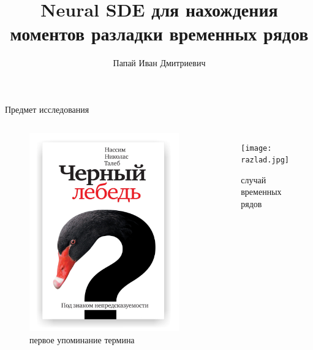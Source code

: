 \documentclass{beamer}
\title[\hbox to 56mm{Neural SDE}]{Neural SDE для нахождения моментов разладки временных рядов}
\author[И.\,Д. Папай]{Папай Иван Дмитриевич}
\institute{Московский физико-технический институт}
\date{\footnotesize
\par\smallskip\emph{Курс:} Автоматизация научных исследований\par (практика, В.\,В.~Стрижов)/Группа 128б
\par\smallskip\emph{Эксперт:} В.\,В.~Стрижов
\par\smallskip\emph{Консультант:} Э.\,А.~Владимиров
\par\bigskip\small 2024}
\begin{document}
\begin{frame}
\thispagestyle{empty}
\maketitle
\end{frame}
\begin{frame}{Предмет исследования}

\begin{columns}[c]
\begin{figure}
\includegraphics[width=1.0\textwidth]{black_swan.jpg}
    \caption{первое упоминание термина}
\end{figure}
\begin{figure}
\texttt{[image: razlad.jpg]}
    \caption{случай временных рядов}
\end{figure}
\end{columns}

\end{frame}
\end{document}
